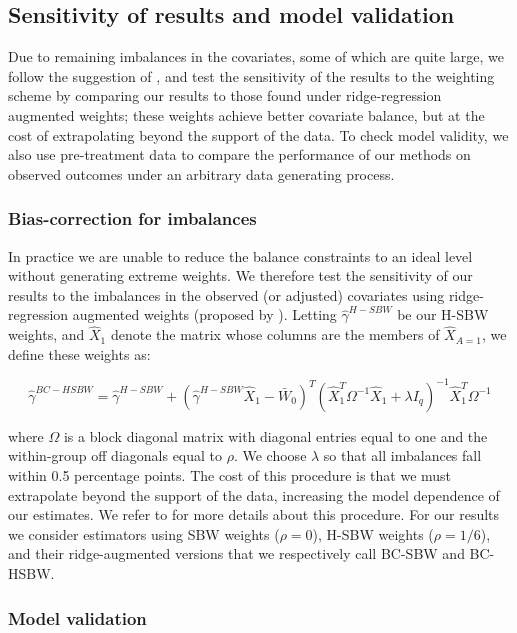 \documentclass[aoas]{imsart}
\theoremstyle{plain}
\theoremstyle{remark}
\begin{document}
\subsection{Sensitivity of results and model validation}

Due to remaining imbalances in the covariates, some of which are quite large, we follow the suggestion of \cite{ben2021augmented}, and test the sensitivity of the results to the weighting scheme by comparing our results to those found under ridge-regression augmented weights; these weights achieve better covariate balance, but at the cost of extrapolating beyond the support of the data. To check model validity, we also use pre-treatment data to compare the performance of our methods on observed outcomes under an arbitrary data generating process. 

\subsubsection{Bias-correction for imbalances}

In practice we are unable to reduce the balance constraints to an ideal level without generating extreme weights. We therefore test the sensitivity of our results to the imbalances in the observed (or adjusted) covariates using ridge-regression augmented weights (proposed by \cite{ben2021augmented}). Letting $\hat{\gamma}^{H-SBW}$ be our H-SBW weights, and $\hat{X}_1$ denote the matrix whose columns are the members of $\hat{X}_{A=1}$, we define these weights as:

\begin{equation}
\hat{\gamma}^{BC-HSBW} = \hat{\gamma}^{H-SBW} + (\hat{\gamma}^{H-SBW}\hat{X}_1 - \bar{W}_0)^T(\hat{X}_1^T\Omega^{-1}\hat{X}_1 + \lambda I_q)^{-1}\hat{X}_1^T\Omega^{-1}
\end{equation}

where $\Omega$ is a block diagonal matrix with diagonal entries equal to one and the within-group off diagonals equal to $\rho$. We choose $\lambda$ so that all imbalances fall within 0.5 percentage points. The cost of this procedure is that we must extrapolate beyond the support of the data, increasing the model dependence of our estimates. We refer to \cite{ben2021augmented} for more details about this procedure. For our results we consider estimators using SBW weights ($\rho = 0$), H-SBW weights ($\rho = 1/6$), and their ridge-augmented versions that we respectively call BC-SBW and BC-HSBW. 
\subsubsection{Model validation}
\end{document}
